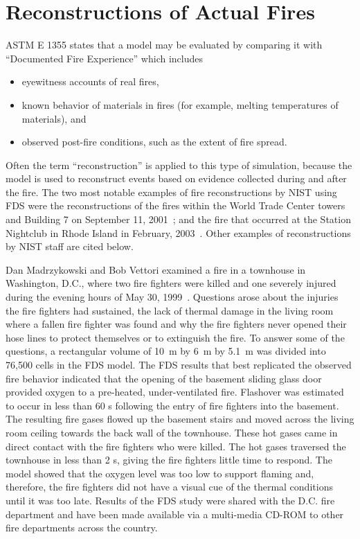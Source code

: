 \section{Reconstructions of Actual Fires}

ASTM E 1355 states that a model may be evaluated by comparing it with ``Documented Fire Experience'' which includes
\begin{itemize}
\item eyewitness accounts of real fires,
\item known behavior of materials in fires (for example, melting temperatures of materials), and
\item observed post-fire conditions, such as the extent of fire spread.
\end{itemize}
Often the term ``reconstruction'' is applied to this type of simulation, because the model is used to reconstruct events based on evidence collected during and after the
fire. The two most
notable examples of fire reconstructions by NIST using FDS were the reconstructions of the fires within the World Trade Center towers and Building 7 on September 11, 2001~\cite{NIST_NCSTAR_1-5F};
and the fire that occurred at the Station Nightclub in Rhode Island in February, 2003~\cite{Grosshandler:Station}. Other examples of reconstructions by NIST staff are
cited below.


Dan Madrzykowski and Bob Vettori examined a fire in a townhouse in Washington, D.C., where
two fire fighters were killed and one severely injured during the evening hours of May 30, 1999~\cite{Madrzykowski:1}. Questions arose
about the injuries the fire fighters had sustained, the lack of thermal damage in the living room where a fallen fire fighter was found and why the
fire fighters never opened their hose lines to protect themselves or to extinguish the fire.
To answer some of the questions, a rectangular volume of 10~m by 6~m by 5.1~m was divided into 76,500 cells in the FDS model. The FDS results that
best replicated the observed fire behavior indicated that the opening of the basement sliding glass door provided oxygen to a pre-heated,
under-ventilated fire. Flashover was estimated to occur in less than 60 s following the entry of fire fighters into the basement. The resulting fire
gases flowed up the basement stairs and moved across the living room ceiling towards the back wall of the townhouse. These hot gases came in direct
contact with the fire fighters who were killed. The hot gases traversed the townhouse in less than 2 s, giving the fire fighters little time to
respond. The model showed that the oxygen level was too low to support flaming and, therefore, the fire fighters did not have a visual cue of the
thermal conditions until it was too late. Results of the FDS study were shared with the D.C. fire department and have been made available via a
multi-media CD-ROM to other fire departments across the country.

